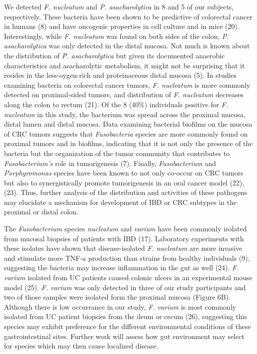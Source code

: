 \documentclass[11pt,]{article}
\begin{document}
We detected \emph{F. nucleatum} and \emph{P. asacharolytica} in 8 and 5
of our subjects, respectively. These bacteria have been shown to be
predictive of colorectal cancer in humans (8) and have oncogenic
properties in cell culture and in mice (20). Interestingly, while
\emph{F. nucleatum} was found on both sides of the colon, \emph{P.
asacharolytica} was only detected in the distal mucosa. Not much is
known about the distribution of \emph{P. asacharolytica} but given its
documented anaerobic characteristics and asacharolytic metabolism, it
might not be surprising that it resides in the less-oygen-rich and
proteinaceous distal mucosa (5). In studies examining bacteria on
colorectal cancer tumors, \emph{F. nucleatum} is more commonly detected
on proximal-sided tumors, and distribution of \emph{F. nucleatum}
decreases along the colon to rectum (21). Of the 8 (40\%) individuals
positive for \emph{F. nucleatum} in this study, the bacterium was spread
across the proximal mucosa, distal lumen and distal mucosa. Data
examining bacterial biofilms on the mucosa of CRC tumors suggests that
\emph{Fusobacteria} species are more commonly found on proximal tumors
and in biofilms, indicating that it is not only the presence of the
bacteria but the organization of the tumor community that contributes to
\emph{Fusobacterium's} role in tumorigenesis (7). Finally,
\emph{Fusobacterium} and \emph{Porphyromonas} species have been known to
not only co-occur on CRC tumors but also to synergistically promote
tumorigenesis in an oral cancer model (22), (23). Thus, further analysis
of the distribution and activities of these pathogens may elucidate a
mechanism for development of IBD or CRC subtypes in the proximal or
distal colon.

The \emph{Fusobacterium} species \emph{nucleatum} and \emph{varium} have
been commonly isolated from mucosal biopsies of patients with IBD (17).
Laboratory experiments with these isolates have shown that
disease-isolated \emph{F. nucleatum} are more invasive and stimulate
more TNF-a production than strains from healthy individuals (9),
suggesting the bacteria may increase inflammation in the gut as well
(24). \emph{F. varium} isolated from UC patients caused colonic ulcers
in an experimental mouse model (25). \emph{F. varium} was only detected
in three of our study participants and two of those samples were
isolated form the proximal mucosa (Figure 6B). Although there is low
occurrance in our study, \emph{F. varium} is most commonly isolated from
UC patient biopsies from the ileum or cecum (26), suggesting this
species may exhibit preference for the different environmental
conditions of these gastrointestinal sites. Further work will assess how
gut environment may select for species which may then cause localized
disease.
\end{document}

